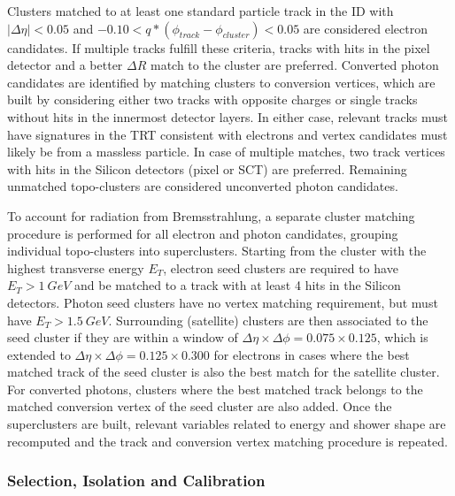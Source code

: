Clusters matched to at least one standard particle track in the ID with $|\Delta\eta| < 0.05$ and 
$-0.10 < q*(\phi_{track}-\phi_{cluster}) < 0.05$ are considered electron candidates. If multiple tracks fulfill these 
criteria, tracks with hits in the pixel detector and a better $\Delta R$ match to the cluster are preferred. Converted 
photon candidates are identified by matching clusters to conversion vertices, which are built by considering either 
two tracks with opposite charges or single tracks without hits in the innermost detector layers. In either case, 
relevant tracks must have signatures in the TRT consistent with electrons and vertex candidates must likely be from 
a massless particle. In case of multiple matches, two track vertices with hits in the Silicon detectors (pixel or SCT) 
are preferred. Remaining unmatched topo-clusters are considered unconverted photon candidates. \par

To account for radiation from Bremsstrahlung, a separate cluster matching procedure is performed for all electron and 
photon candidates, grouping individual topo-clusters into superclusters. Starting from the cluster with the highest 
transverse energy $E_T$, electron seed clusters are required to have $E_T > 1\ GeV$ and be matched to a track with 
at least 4 hits in the Silicon detectors. Photon seed clusters have no vertex matching requirement, but must have 
$E_T > 1.5\ GeV$. Surrounding (satellite) clusters are then associated to the seed cluster if they are within a window 
of $\Delta\eta\times\Delta\phi =0.075\times0.125$, which is extended to $\Delta\eta\times\Delta\phi =0.125\times0.300$ 
for electrons in cases where the best matched track of the seed cluster is also the best match for the satellite 
cluster. For converted photons, clusters where the best matched track belongs to the matched conversion vertex of the 
seed cluster are also added. Once the superclusters are built, relevant variables related to energy and shower shape 
are recomputed and the track and conversion vertex matching procedure is repeated. \par

\subsubsection*{Selection, Isolation and Calibration}

